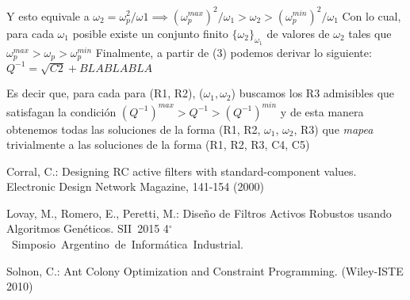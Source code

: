 \documentclass{llncs}
\begin{document}
    Y esto equivale a 
    $\omega_2 = \omega_p^2 / \omega1 \implies (\omega_p^{max})^2 / \omega_1 > \omega_2 > (\omega_p^{min})^2 / \omega_1 $
    \newline
    Con lo cual, para cada $\omega_1$ posible existe un conjunto finito $\{{\omega_2}\}_{\omega_1}$ de valores de $\omega_2$
    tales que $ \omega_p^{max} > \omega_p > \omega_p^{min} $
    \newline \newline
    Finalmente, a partir de (3) podemos derivar lo siguiente:\newline
    $Q^{-1} = \sqrt{C2} + BLA BLA BLA $
    
    Es decir que, para cada para (R1, R2), ($\omega_1, \omega_2$) buscamos los R3 admisibles que satisfagan la
    condici\'on \newline \newline $(Q^{-1})^{max} > Q^{-1} > (Q^{-1})^{min} $ \newline \newline
    y de esta manera obtenemos todas las soluciones de la forma (R1, R2, $\omega_1$, $\omega_2$, R3) 
    que \textit{mapea} trivialmente a las soluciones de la forma (R1, R2, R3, C4, C5)

  \begin{thebibliography}{1}
      Corral, C.: 
      Designing RC active filters with standard-component values. Electronic Design
      Network Magazine, 141-154 (2000)
      
      Lovay, M., Romero, E., Peretti, M.:
      Dise\~no de Filtros Activos Robustos usando Algoritmos Gen\'eticos.
      SII 2015 4$^\circ$ Simposio Argentino de Inform\'atica Industrial.
      
      Solnon, C.:
      Ant Colony Optimization and Constraint Programming. (Wiley-ISTE 2010) 
  
  \end{thebibliography}
\end{document}
